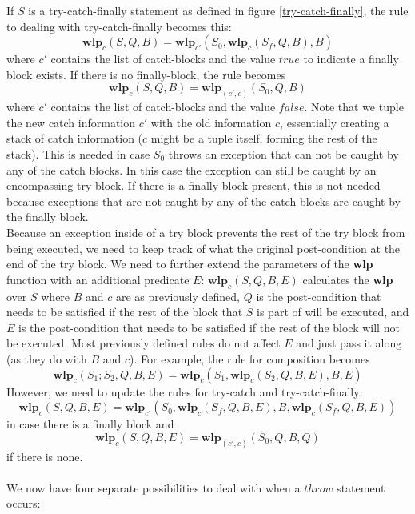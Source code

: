 \documentclass[a4paper, fleqn]{article}
\newcommand{\wlp}{\textbf{wlp}\xspace}
\begin{document}
If $S$ is a try-catch-finally statement as defined in figure \ref{try-catch-finally}, the rule to dealing with try-catch-finally becomes this: \[\wlp_{c}(S, Q, B) = \wlp_{c'}(S_0, \wlp_{c}(S_f, Q, B), B)\] where $c'$ contains the list of catch-blocks and the value $true$ to indicate a finally block exists. If there is no finally-block, the rule becomes \[\wlp_{c}(S, Q, B) = \wlp_{(c', c)}(S_0, Q, B)\] where $c'$ contains the list of catch-blocks and the value $false$. Note that we tuple the new catch information $c'$ with the old information $c$, essentially creating a stack of catch information ($c$ might be a tuple itself, forming the rest of the stack). This is needed in case $S_0$ throws an exception that can not be caught by any of the catch blocks. In this case the exception can still be caught by an encompassing try block. If there is a finally block present, this is not needed because exceptions that are not caught by any of the catch blocks are caught by the finally block.
\\
Because an exception inside of a try block prevents the rest of the try block from being executed, we need to keep track of what the original post-condition at the end of the try block. We need to further extend the parameters of the \wlp function with an additional predicate $E$: $\wlp_{c}(S, Q, B, E)$ calculates the \wlp over $S$ where $B$ and $c$ are as previously defined, $Q$ is the post-condition that needs to be satisfied if the rest of the block that $S$ is part of will be executed, and $E$ is the post-condition that needs to be satisfied if the rest of the block will not be executed. Most previously defined rules do not affect $E$ and just pass it along (as they do with $B$ and $c$). For example, the rule for composition becomes \[\wlp_{c}(S_1;S_2, Q, B, E) = \wlp_{c}(S_1, \wlp_{c}(S_2, Q, B, E) , B, E)\] However, we need to update the rules for try-catch and try-catch-finally: \[\wlp_{c}(S, Q, B, E) = \wlp_{c'}(S_0, \wlp_{c}(S_f, Q, B, E),  B, \wlp_{c}(S_f, Q, B, E))\] in case there is a finally block and \[\wlp_{c}(S, Q, B, E) = \wlp_{(c', c)}(S_0, Q, B, Q)\] if there is none.
\\
\\
We now have four separate possibilities to deal with when a $throw$ statement occurs:
\end{document}

